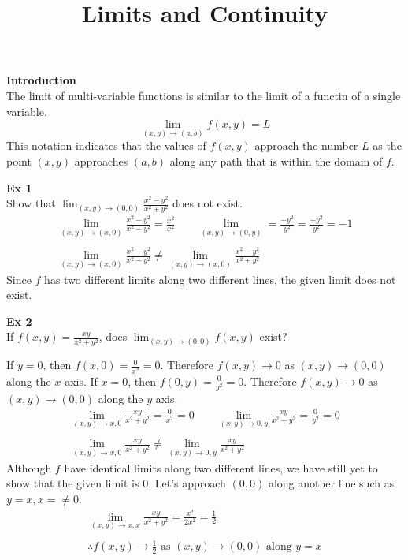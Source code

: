 \documentclass{article}
\title{Limits and Continuity}
\begin{document}
  \maketitle
  \textbf{Introduction}\\
  The limit of multi-variable functions is similar to the limit of a functin of a single variable.
  \[
    \lim_{(x,y)\to(a,b)}f(x,y)=L 
  \]
  This notation indicates that the values of $ f(x,y) $ approach the number $ L $ as the point $ (x,y) $ approaches $ (a,b) $ along any path that is within the domain of $ f $.
  
 \textbf{Ex 1}\\
 Show that $ \lim_{(x,y)\to(0,0)}\frac{x^{2}-y^{2}}{x^{2}+y^{2}}$ does not exist.
 \[
   \begin{gathered}
   \lim_{(x,y)\to(x,0)} \frac{x^{2}-y^{2}}{x^{2}+y^{2}} =\frac{x^{2}}{x^{2}} \qquad \lim_{(x,y)\to(0,y)}=\frac{-y^{2}}{y^{2}}= \frac{-y^{2}}{y^{2}}=-1\\
   ~\\
   \lim_{(x,y)\to(x,0)} \frac{x^{2}-y^{2}}{x^{2}+y^{2}}\neq \lim_{(x,y)\to(x,0)} \frac{x^{2}-y^{2}}{x^{2}+y^{2}}   
   \end{gathered}
 \]
 Since $ f $ has two different limits along two different lines, the given limit does not exist.

 \textbf{Ex 2}\\
 If $ f(x,y)  = \frac{xy}{x^{2}+y^{2}  }$, does $ \lim_{(x,y)\to(0,0)} f(x,y) $ exist?

 If $ y=0 $, then $ f(x,0)=\frac{0}{x^{2} } =0 $. Therefore $ f(x,y)\to 0$ as $ (x,y)\to(0,0) $ along the $ x $ axis. If $ x=0 $, then $ f(0,y)=\frac{0}{y^{2} } =0 $. Therefore $ f(x,y)\to 0$ as $ (x,y)\to(0,0) $ along the $ y $ axis.     
 \[
   \begin{gathered}
   \lim_{(x,y)\to x,0} \frac{xy}{x^{2}+y^{2}}=\frac{0}{x^{2}} = 0 \qquad \lim_{(x,y)\to 0,y} \frac{xy}{x^{2}+y^{2}}=\frac{0}{y^{2} }=0\\
   ~\\
   \lim_{(x,y)\to x,0} \frac{xy}{x^{2}+y^{2}} \neq  \lim_{(x,y)\to 0,y} \frac{xy}{x^{2}+y^{2}}  
   \end{gathered}
 \]
 Although $ f $ have identical limits along two different lines, we have still yet to show that the given limit is $ 0 $. Let's approach $ (0,0) $ along another line such as $ y=x, x=\neq0 $.
 \[
   \begin{gathered}
   \lim_{(x,y)\to x,x} \frac{xy}{x^{2}+y^{2}} =\frac{x^{2}}{2x^{2}}=\frac{1}{2}\\
   ~\\
  \boxed{\therefore f(x,y)\to\frac{1}{2} \text{ as } (x,y)\to(0,0) \text{ along }y=x}
   \end{gathered}
 \]
 
\end{document}
